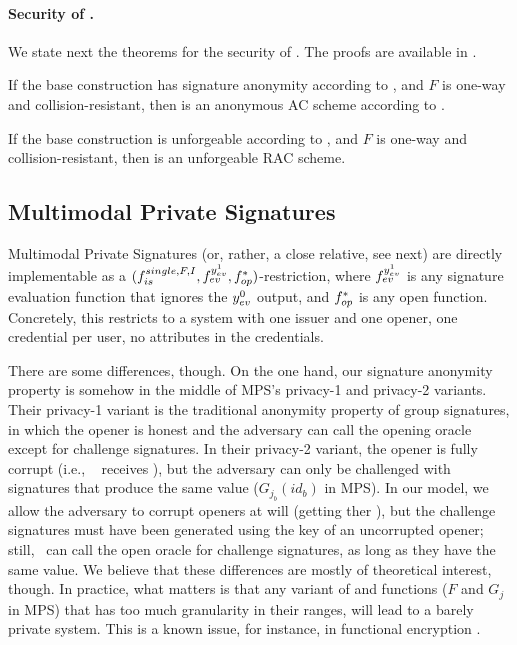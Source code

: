 \paragraph{Security of \CUASRAC.} %
We state next the theorems for the security of \CUASRAC. The proofs are
available in .

\begin{theorem}
  If the base \CUASGen construction has signature anonymity according to
  , and $F$ is one-way and collision-resistant,
  then \CUASAC is an anonymous AC scheme according to \cite{fhs19}.  
\end{theorem}

\begin{theorem}
  If the base \CUASGen construction is unforgeable according to
  , and $F$ is one-way and collision-resistant, then
  \CUASRAC is an unforgeable RAC scheme.
\end{theorem}


\subsection{Multimodal Private Signatures}
\label{ssec:related-models-mps}

Multimodal Private Signatures (or, rather, a close relative, see next) are
directly implementable as a $(f_{is}^{single,F,I},f_{ev}^{y_{ev}^1},
f_{op}^{\ast})$-\CUASGen restriction, where $f_{ev}^{y_{ev}^1}$ is any signature
evaluation function that ignores the $y_{ev}^0$ output, and $f_{op}^{\ast}$ is
any open function. Concretely, this restricts to a system with one issuer and
one opener, one credential per user, no attributes in the credentials.

There are some differences, though. On the one hand, our signature anonymity
property is somehow in the middle of MPS's privacy-1 and privacy-2 variants.
Their privacy-1 variant is the traditional anonymity property of group
signatures, in which the opener is honest and the adversary can call the opening
oracle except for challenge signatures. In their privacy-2 variant, the opener
is fully corrupt (i.e., \adv~ receives \osk), but the adversary can only be
challenged with signatures that produce the same \yinsp value ($G_{j_b}(id_b)$
in MPS). In our \UAS model, we allow the adversary to corrupt openers at will
(getting ther \osk), but the challenge signatures must have been generated using
the key of an uncorrupted opener; still, \adv~can call the open oracle for
challenge signatures, as long as they have the same \yinsp value. We believe
that these differences are mostly of theoretical interest, though. In practice,
what matters is that any variant of \feval and \finsp functions ($F$ and $G_j$
in MPS) that has too much granularity in their ranges, will lead to a barely
private system. This is a known issue, for instance, in functional encryption
\needcite.


